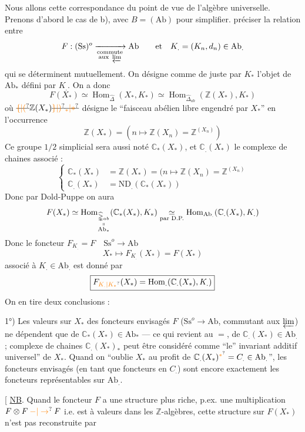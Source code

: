 Nous allons  cette correspondance du point de vue de l'algèbre universelle. Prenons d'abord le cas de b), avec $B=(\mathrm{Ab})$ pour simplifier.  préciser la relation entre
\[
F:(\mathrm{Ss})^o\xrightarrow[\substack{\text{commute}\\\text{aux }\varprojlim}]{}\mathrm{Ab} \qquad\text{et}\quad K_{.}=(K_n,d_n)\in \mathrm{Ab}_{.}
\]
qui se déterminent mutuellement. On désigne comme de juste par $K_*$ l'objet de $\mathrm{Ab}_*$ défini par $K_{.}$. On a donc
\[
F(X_*)\simeq\operatorname{Hom}_{\widehat{\mathbb{\Delta}}}(X_*,K_*)\simeq\operatorname{Hom}_{\widehat{\mathbb{\Delta}}_{ab}}(\mathbb{Z}(X_*),K_*)
\]
où $\deleted{\unsure{\{|(}}\mathbb{Z}(X_*)\deleted{\unsure{\}|)}}\deleted{\unsure{{}_*|*}}$ désigne le ``faisceau abélien libre engendré par $X_*$'' en l'occurrence
\[
\mathbb{Z}(X_*)=(n\longmapsto\mathbb{Z}(X_n)=\mathbb{Z}^{(X_n)})
\]
Ce groupe  $1/2$ simplicial sera aussi noté $\mathbb{C}_*(X_*)$, et $\mathbb{C}_{.}(X_*)$ le complexe de chaines associé  : 
\[
\left\{\begin{aligned}
\mathbb{C}_*(X_*)&=\mathbb{Z}(X_*)=(n\longmapsto\mathbb{Z}(X_n)=\mathbb{Z}^{(X_n)}\\
\mathbb{C}_{.}(X_*)&=\mathrm{ND}_{.}(\mathbb{C}_*(X_*))
\end{aligned}\right.
\]
Donc par Dold-Puppe on aura
\[
F(X_*)\simeq\operatorname{Hom}_{\substack{\widehat{\mathbb{\Delta}}_{ab}\\\shortparallel\\\mathrm{Ab}_*}}(\mathbb{C}_*(X_*),K_*)\underset{\text{par D.P.}}{\simeq}\operatorname{Hom}_{\mathrm{Ab}_{.}}(\mathbb{C}_{.}(X_*),K_{.})
\]
Donc le foncteur $F_{K_{.}}=F\quad \mathrm{Ss}^o\longrightarrow \mathrm{Ab}$
\[
X_*\longmapsto F_{K_{.}}(X_*)=F(X_*)
\]
associé à $K_{.}\in \mathrm{Ab}_{.}$ est donné par
\[
\boxed{F_{\unsure{K_{.}|K_*}}(X_*)=\operatorname{Hom}_{.}(\mathbb{C}_{.}(X_*),K_{.})}
\]
On en tire deux conclusions :

1°) Les valeurs sur $X_*$ des foncteurs envisagés $F$ ($\mathrm{Ss}^o\longrightarrow \mathrm{Ab}$, commutant aux $\varprojlim$) ne dépendent que de $\mathbb{C}_*(X_*)\in \mathrm{Ab}_*$  --- ce qui revient au $=$, de $\mathbb{C}_{.}(X_*)\in \mathrm{Ab}_{.}$ ;  complexe de chaines $\mathbb{C}_{.}(X_*)_*$ peut être considéré comme ``le'' invariant additif universel'' de $X_*$. Quand on ``oublie $X_*$ au profit de $\mathbb{C}_{.}(X_*)^{\unsure{*}}=C_{.}\in \mathrm{Ab}_{.}$'', les foncteurs envisagés (en tant que foncteurs en $C_{.}$) sont encore exactement les foncteurs représentables sur $\mathrm{Ab}_{.}$.

[ \uline{NB}. Quand le foncteur $F$ a une structure plus riche, p.ex. une multiplication $F\otimes F\mathbin{\unsure{-|\to}}F$ i.e. est à valeurs dans les $\mathbb Z$-algèbres,  cette structure sur $F(X_*)$ n'est pas reconstruite par
